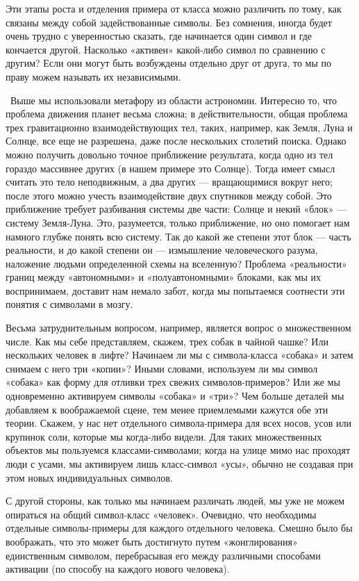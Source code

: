 \documentclass[../main.tex]{subfiles}
\begin{document}
Эти этапы роста и отделения примера от класса можно различить по тому, как связаны между собой задействованные символы. Без сомнения, иногда будет очень трудно с уверенностью сказать, где начинается один символ и где кончается другой. Насколько «активен» какой-либо символ по сравнению с другим? Если они могут быть возбуждены отдельно друг от друга, то мы по праву можем называть их независимыми.

~Выше мы использовали метафору из области астрономии. Интересно то, что проблема движения планет весьма сложна; в действительности, общая проблема трех гравитационно взаимодействующих тел, таких, например, как Земля, Луна и Солнце, все еще не разрешена, даже после нескольких столетий поиска. Однако можно получить довольно точное приближение результата, когда одно из тел гораздо массивнее других (в нашем примере это Солнце). Тогда имеет смысл считать это тело неподвижным, а два других --- вращающимися вокруг него; после этого можно учесть взаимодействие двух спутников между собой. Это приближение требует разбивания системы две части: Солнце и некий «блок» --- систему Земля-Луна. Это, разумеется, только приближение, но оно помогает нам намного глубже понять всю систему. Так до какой же степени этот блок --- часть реальности, и до какой степени он --- измышление человеческого разума, наложение людьми определенной схемы на вселенную? Проблема «реальности» границ между «автономными» и «полуавтономными» блоками, как мы их воспринимаем, доставит нам немало забот, когда мы попытаемся соотнести эти понятия с символами в мозгу.

Весьма затруднительным вопросом, например, является вопрос о множественном числе. Как мы себе представляем, скажем, трех собак в чайной чашке? Или нескольких человек в лифте? Начинаем ли мы с символа-класса «собака» и затем снимаем с него три «копии»? Иными словами, используем ли мы символ «собака» как форму для отливки трех свежих символов-примеров? Или же мы одновременно активируем символы «собака» и «три»? Чем больше деталей мы добавляем к воображаемой сцене, тем менее приемлемыми кажутся обе эти теории. Скажем, у нас нет отдельного символа-примера для всех носов, усов или крупинок соли, которые мы когда-либо видели. Для таких множественных объектов мы пользуемся классами-символами; когда на улице мимо нас проходят люди с усами, мы активируем лишь класс-символ «усы», обычно не создавая при этом новых индивидуальных символов.

С другой стороны, как только мы начинаем различать людей, мы уже не можем опираться на общий символ-класс «человек». Очевидно, что необходимы отдельные символы-примеры для каждого отдельного человека. Смешно было бы воображать, что это может быть достигнуто путем «жонглирования» единственным символом, перебрасывая его между различными способами активации (по способу на каждого нового человека).
\end{document}
